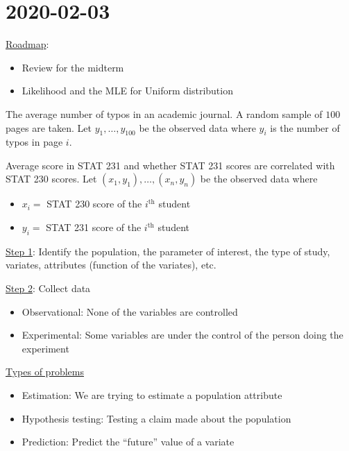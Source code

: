 \section{2020-02-03}
\underline{Roadmap}:
\begin{itemize}
    \item Review for the midterm
    \item Likelihood and the MLE for Uniform distribution
\end{itemize}

\begin{Example}{}{}
    The average number of typos in an academic journal. A random
    sample of $ 100 $ pages are taken. Let $ y_1,\ldots ,y_{100} $
    be the observed data where $ y_i $ is the number of typos
    in page $ i $.
\end{Example}


\begin{Example}{}{}
    Average score in STAT 231 and whether STAT 231 scores
    are correlated with STAT 230 scores.
    Let $ (x_1,y_1),\ldots ,(x_n,y_n) $ be the observed data
    where
    \begin{itemize}
        \item $ x_i= $ STAT 230 score of the $ i^{\text{th}} $ student
        \item $ y_i= $ STAT 231 score of the $ i^{\text{th}} $ student
    \end{itemize}
\end{Example}

\underline{Step 1}: Identify the population, the parameter of interest,
the type of study, variates, attributes (function of the variates), etc.

\underline{Step 2}: Collect data
\begin{itemize}
    \item Observational: None of the variables are controlled
    \item Experimental: Some variables are under the control of the person
          doing the experiment
\end{itemize}
\underline{Types of problems}
\begin{itemize}
    \item Estimation: We are trying to estimate a population attribute
    \item Hypothesis testing: Testing a claim made about the population
    \item Prediction: Predict the ``future'' value of a variate
\end{itemize}

